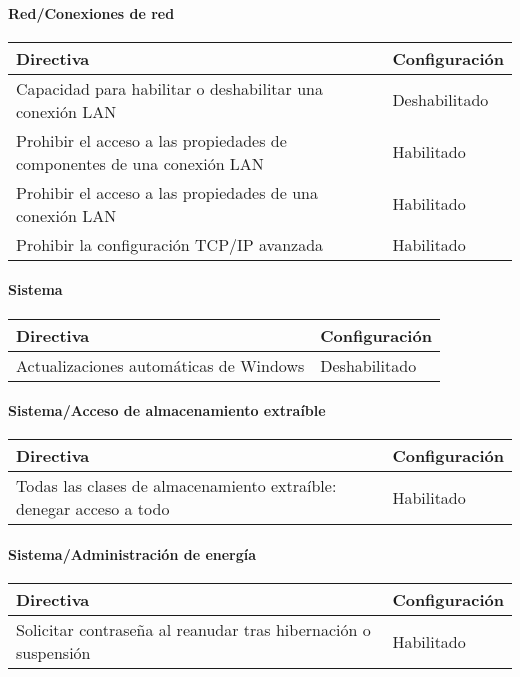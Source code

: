 \documentclass[
]{article}
\begin{document}
\hypertarget{redconexiones-de-red}{%
\paragraph{Red/Conexiones de red}\label{redconexiones-de-red}}

\begin{longtable}[]{@{}ll@{}}
\toprule
\textbf{Directiva} & \textbf{Configuración}\tabularnewline
\midrule
\endhead
Capacidad para habilitar o deshabilitar una conexión LAN &
Deshabilitado\tabularnewline
Prohibir el acceso a las propiedades de componentes de una conexión LAN
& Habilitado\tabularnewline
Prohibir el acceso a las propiedades de una conexión LAN &
Habilitado\tabularnewline
Prohibir la configuración TCP/IP avanzada & Habilitado\tabularnewline
\bottomrule
\end{longtable}

\hypertarget{sistema}{%
\paragraph{Sistema}\label{sistema}}

\begin{longtable}[]{@{}ll@{}}
\toprule
\textbf{Directiva} & \textbf{Configuración}\tabularnewline
\midrule
\endhead
Actualizaciones automáticas de Windows & Deshabilitado\tabularnewline
\bottomrule
\end{longtable}

\hypertarget{sistemaacceso-de-almacenamiento-extrauxedble}{%
\paragraph{Sistema/Acceso de almacenamiento
extraíble}\label{sistemaacceso-de-almacenamiento-extrauxedble}}

\begin{longtable}[]{@{}ll@{}}
\toprule
\textbf{Directiva} & \textbf{Configuración}\tabularnewline
\midrule
\endhead
Todas las clases de almacenamiento extraíble: denegar acceso a todo &
Habilitado\tabularnewline
\bottomrule
\end{longtable}

\hypertarget{sistemaadministraciuxf3n-de-energuxeda}{%
\paragraph{Sistema/Administración de
energía}\label{sistemaadministraciuxf3n-de-energuxeda}}

\begin{longtable}[]{@{}ll@{}}
\toprule
\textbf{Directiva} & \textbf{Configuración}\tabularnewline
\midrule
\endhead
Solicitar contraseña al reanudar tras hibernación o suspensión &
Habilitado\tabularnewline
\bottomrule
\end{longtable}
\end{document}
